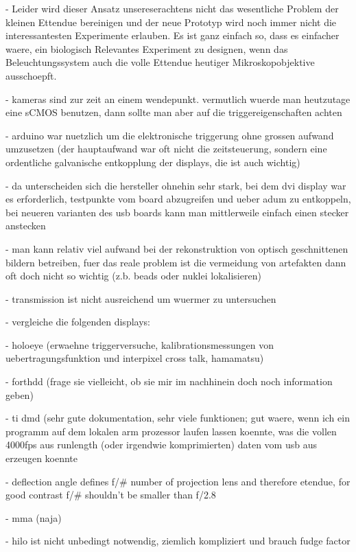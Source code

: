 \documentclass[oneside,a4paper,12pt,BCOR20mm,DIV14]{scrbook}
\begin{document}
  - Leider wird dieser Ansatz unsereserachtens nicht das wesentliche
    Problem der kleinen Ettendue bereinigen und der neue Prototyp wird
    noch immer nicht die interessantesten Experimente erlauben. Es ist
    ganz einfach so, dass es einfacher waere, ein biologisch
    Relevantes Experiment zu designen, wenn das Beleuchtungssystem
    auch die volle Ettendue heutiger Mikroskopobjektive ausschoepft.

- kameras sind zur zeit an einem wendepunkt. vermutlich wuerde man
  heutzutage eine sCMOS benutzen, dann sollte man aber auf die
  triggereigenschaften achten

- arduino war nuetzlich um die elektronische triggerung ohne grossen
  aufwand umzusetzen (der hauptaufwand war oft nicht die
  zeitsteuerung, sondern eine ordentliche galvanische entkopplung der
  displays, die ist auch wichtig)

  - da unterscheiden sich die hersteller ohnehin sehr stark, bei dem
    dvi display war es erforderlich, testpunkte vom board abzugreifen
    und ueber adum zu entkoppeln, bei neueren varianten des usb boards
    kann man mittlerweile einfach einen stecker anstecken

- man kann relativ viel aufwand bei der rekonstruktion von optisch
  geschnittenen bildern betreiben, fuer das reale problem ist die
  vermeidung von artefakten dann oft doch nicht so wichtig (z.b. beads
  oder nuklei lokalisieren)

- transmission ist nicht ausreichend um wuermer zu untersuchen  

- vergleiche die folgenden displays:

  - holoeye (erwaehne triggerversuche, kalibrationsmessungen von
    uebertragungsfunktion und interpixel cross talk, hamamatsu)

  - forthdd (frage sie vielleicht, ob sie mir im nachhinein doch noch
    information geben)

  - ti dmd (sehr gute dokumentation, sehr viele funktionen; gut waere,
    wenn ich ein programm auf dem lokalen arm prozessor laufen lassen
    koennte, was die vollen 4000fps aus runlength (oder irgendwie
    komprimierten) daten vom usb aus erzeugen koennte

    - deflection angle defines f/\# number of projection lens and
      therefore etendue, for good contrast f/\# shouldn't be smaller
      than f/2.8

  - mma (naja)

- hilo ist nicht unbedingt notwendig, ziemlich kompliziert und brauch
  fudge factor
\end{document}
